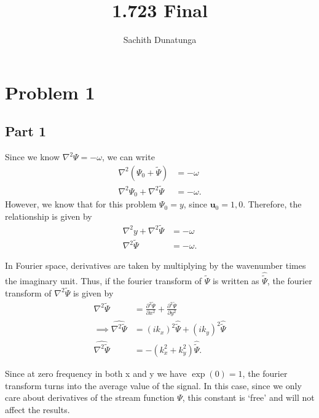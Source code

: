 \documentclass{article}
\title{1.723 Final}
\author{Sachith  Dunatunga}
\begin{document}
\newcommand{\deriv}[2]{\frac{\partial #1}{ \partial #2}}
\newcommand{\nderiv}[3]{\frac{\partial^{#3} #1}{ \partial #2^{#3}}}
\newcommand{\dx}[1]{\deriv{#1}{x}}
\newcommand{\taylorexpf}[3]{#1_{#2} + \left(#3 \right) \dx{#1}\biggr\rvert_{#2} + \frac{1}{2}\left(#3 \right)^2 \nderiv{#1}{x}{2}\biggr\rvert_{#2} + \frac{1}{6}\left(#3 \right)^3\nderiv{#1}{x}{3}\biggr\rvert_{#2} + \frac{1}{24}\left(#3 \right)^4\nderiv{#1}{x}{4}\biggr\rvert_{#2} + O(h^5)}
\maketitle

\section{Problem 1}
\subsection{Part 1}
Since we know $\nabla^2 \Psi = - \omega$, we can write
\begin{align}
    \nabla^2 (\Psi_0 + \tilde{\Psi}) &= -\omega \\
    \nabla^2 \Psi_0 + \nabla^2 \tilde{\Psi} &= -\omega.
\end{align}
However, we know that for this problem $\Psi_0 = y$, since $\mathbf{u}_0 = {1, 0}$.
Therefore, the relationship is given by
\begin{align}
    \nabla^2 y + \nabla^2 \tilde{\Psi} &= -\omega \\
    \nabla^2 \tilde{\Psi} &= -\omega.
\end{align}

In Fourier space, derivatives are taken by multiplying by the wavenumber times the imaginary unit.
Thus, if the fourier transform of $\tilde{\Psi}$ is written as $\hat{\tilde{\Psi}}$, the fourier transform of $\nabla^2 \tilde{\Psi}$ is given by
\begin{align}
    \nabla^2 \tilde{\Psi} &= \nderiv{\tilde{\Psi}}{x}{2} + \nderiv{\tilde{\Psi}}{y}{2} \\
\implies \widehat{\nabla^2 \tilde{\Psi}} &= (ik_x)^2 \hat{\tilde{\Psi}} + (ik_y)^2 \hat{\tilde{\Psi}}\\
    \widehat{\nabla^2 \tilde{\Psi}} &= -(k^2_x + k^2_y) \hat{\tilde{\Psi}}.
\end{align}

Since at zero frequency in both x and y we have $\exp(0) = 1$, the fourier transform turns into the average value of the signal.
In this case, since we only care about derivatives of the stream function $\Psi$, this constant is `free' and will not affect the results.
\end{document}
